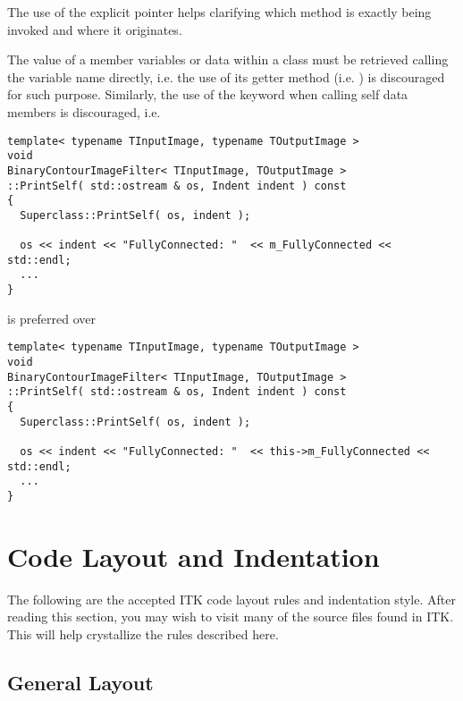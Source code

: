 The use of the explicit pointer helps clarifying which method is
exactly being invoked and where it originates.

The value of a member variables or data within a class must be retrieved calling
the variable name directly, i.e. the use of its getter method (i.e.
) is discouraged for such purpose. Similarly, the use of the
 keyword when calling self data members is discouraged, i.e.

\small
\begin{verbatim}
template< typename TInputImage, typename TOutputImage >
void
BinaryContourImageFilter< TInputImage, TOutputImage >
::PrintSelf( std::ostream & os, Indent indent ) const
{
  Superclass::PrintSelf( os, indent );

  os << indent << "FullyConnected: "  << m_FullyConnected << std::endl;
  ...
}
\end{verbatim}
\normalsize

is preferred over

\small
\begin{verbatim}
template< typename TInputImage, typename TOutputImage >
void
BinaryContourImageFilter< TInputImage, TOutputImage >
::PrintSelf( std::ostream & os, Indent indent ) const
{
  Superclass::PrintSelf( os, indent );

  os << indent << "FullyConnected: "  << this->m_FullyConnected << std::endl;
  ...
}
\end{verbatim}
\normalsize


\section{Code Layout and Indentation}
\label{sec:CodeLayoutAndIndentation}

The following are the accepted ITK code layout rules and indentation style.
After reading this section, you may wish to visit many of the source files found
in ITK. This will help crystallize the rules described here.


\subsection{General Layout}
\label{subsec:GeneralLayout}

